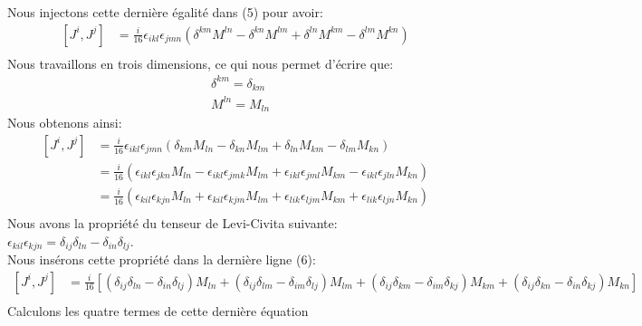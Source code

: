 \documentclass[12pt, a4paper]{article}
\begin{document}
 Nous injectons cette dernière égalité dans (5) pour avoir: 
 \begin{equation}
 	\begin{split}
 		[J^{i},J^{j}]
 		&=\frac{i}{16}\epsilon_{ikl}\epsilon_{jmn} (
 		\delta^{k m}M^{l n} - \delta^{k n}M^{l m} +\delta^{l n}M^{k m} - \delta^{l m}M^{k n})\\
 	\end{split}
 \end{equation}
 Nous travaillons en trois dimensions, ce qui nous permet d'écrire que:
 \begin{equation}
 	\begin{split}
 		&\delta^{k m}=\delta_{k m}\\
 		&M^{l n}=M_{l n}
 	\end{split}
 \end{equation}
 Nous obtenons ainsi:
 \begin{equation}
 	\begin{split}
		[J^{i},J^{j}]
		&=\frac{i}{16}\epsilon_{ikl}\epsilon_{jmn} (
		\delta_{k m}M_{l n} - \delta_{k n}M_{l m} +\delta_{l n}M_{k m} - \delta_{l m}M_{k n})\\
 		&=\frac{i}{16}
 		(\epsilon_{ikl}\epsilon_{jkn} M_{l n} 
 		- \epsilon_{ikl}\epsilon_{jmk} M_{l m} 
 		+ \epsilon_{ikl}\epsilon_{jml}M_{k m} 
 		- \epsilon_{ikl}\epsilon_{jln}M_{k n})\\
 		&=\frac{i}{16}
 		(\epsilon_{kil}\epsilon_{kjn} M_{l n} 
 		+ \epsilon_{kil}\epsilon_{kjm} M_{l m} 
 		+ \epsilon_{lik}\epsilon_{ljm}M_{k m} 
 		+ \epsilon_{lik}\epsilon_{ljn}M_{k n})\\
 	\end{split}
 \end{equation}
 Nous avons la propriété du tenseur de Levi-Civita suivante:
 \(\epsilon_{kil}\epsilon_{kjn}=\delta_{ij}\delta_{ln}-\delta_{in}\delta_{lj}\).\\
 Nous insérons cette propriété dans la dernière ligne (6):
 \begin{equation}
 	\begin{split}
 		[J^{i},J^{j}]
 		&=\frac{i}{16}
 		[(\delta_{ij}\delta_{ln}-\delta_{in}\delta_{lj})M_{l n}
 		+(\delta_{ij}\delta_{lm}-\delta_{im}\delta_{lj})M_{l m}
 		+(\delta_{ij}\delta_{km}-\delta_{im}\delta_{kj})M_{k m}
 		+(\delta_{ij}\delta_{kn}-\delta_{in}\delta_{kj})M_{k n}]\\
 	\end{split}
 \end{equation}
 Calculons les quatre termes de cette dernière équation 
\end{document}

